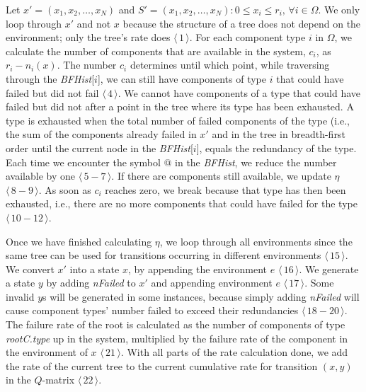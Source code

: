 \documentclass[12pt]{article}
\newcommand{\varName}[1]{\textrm{\it#1}}
\newcommand{\citeLine}[1]{$\langle \, #1 \, \rangle$}
\newcommand{\citeBlock}[2]{$\langle \, #1 - #2 \, \rangle$}
\begin{document}
Let $x' = (x_{1}, x_{2}, \ldots, x_{N})$ and $S' = (x_{1}, x_{2}, \ldots, x_{N}): 0 \leq x_{i} \leq r_{i}, \, \forall i \in \Omega$. We only loop through $x'$ and not $x$ because the structure of a tree does not depend on the environment; only the tree's rate does \citeLine{1}. For each component type $i$ in $\Omega$, we calculate the number of components that are available in the system, $c_{i}$, as $r_{i} - n_{i}(x)$. The number $c_{i}$ determines until which point, while traversing through the \varName{BFHist}[$i$], we can still have components of type $i$ that could have failed but did not fail \citeLine{4}. We cannot have components of a type that could have failed but did not after a point in the tree where its type has been exhausted. A type is exhausted when the total number of failed components of the type (i.e., the sum of the components already failed in $x'$ and in the tree in breadth-first order until the current node in the \varName{BFHist}[$i$], equals the redundancy of the type. Each time we encounter the symbol @ in the \varName{BFHist}, we reduce the number available by one \citeBlock{5}{7}. If there are components still available, we update $\eta$ \citeBlock{8}{9}. As soon as $c_{i}$ reaches zero, we break because that type has then been exhausted, i.e., there are no more components that could have failed for the type \citeBlock{10}{12}.

Once we have finished calculating $\eta$, we loop through all environments since the same tree can be used for transitions occurring in different environments \citeLine{15}. We convert $x'$ into a state $x$, by appending the environment $e$ \citeLine{16}. We generate a state $y$ by adding \varName{nFailed} to $x'$ and appending environment $e$ \citeLine{17}. Some invalid $y$s will be generated in some instances, because simply adding \varName{nFailed} will cause component types' number failed to exceed their redundancies \citeBlock{18}{20}. The failure rate of the root is calculated as the number of components of type \varName{rootC.type} up in the system, multiplied by the failure rate of the component in the environment of $x$ \citeLine{21}. With all parts of the rate calculation done, we add the rate of the current tree to the current cumulative rate for transition $(x, y)$ in the $Q$-matrix \citeLine{22}.
\end{document}
